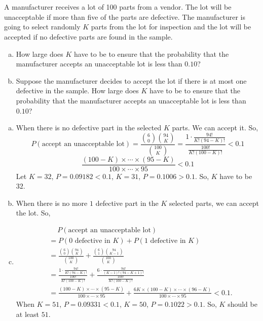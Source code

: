 \documentclass[14pt]{elegantbook}
\begin{document}

\setcounter{chapter}{4}
\chapter{}
    \setcounter{chapter}{3}
    \setcounter{exer}{1}
    \begin{exercise}
        A manufacturer receives a lot of 100 parts from a vendor. The lot will be unacceptable if more than five of the parts are defective. The manufacturer is going to select randomly $K$ parts from the lot for inspection and the lot will be accepted if no defective parts are found in the sample. 
        \begin{enumerate}[(a)]
            \item How large does $K$ have to be to ensure that the probability that the manufacturer accepts an unacceptable lot is less than $0.10$? 
            \item Suppose the manufacturer decides to accept the lot if there is at most one defective in the sample. How large does $K$ have to be to ensure that the probability that the manufacturer accepts an unacceptable lot is less than $0.10$? 
        \end{enumerate}
    \end{exercise}

    \begin{solution}
        \begin{enumerate}[(a)]
            \item When there is no defective part in the selected $K$ parts. We can accept it. So, 
            \[P(\text{accept an unacceptable lot})=\frac{\binom{6}{0}\binom{94}{K}}{\binom{100}{K}}=\frac{1\cdot\frac{94!}{K!(94-K)!}}{\frac{100!}{K!(100-K)!}}<0.1\]
            \[\frac{(100-K)\times\cdots\times(95-K)}{100\times\cdots\times 95}<0.1\]
            Let $K=32$, $P=0.09182<0.1$, $K=31$, $P=0.1006>0.1$. So, $K$ have to be $32$. 
            \item When there is no more $1$ defective part in the $K$ selected parts, we can accept the lot. So,
            \item \begin{align*}
                &\quad\ P(\text{accept an unacceptable lot})\\&=P(\text{$0$ defective in $K$})+P(\text{$1$ defective in $K$})\\
                &=\frac{\binom{6}{0}\binom{94}{K}}{\binom{100}{K}}+\frac{\binom{6}{1}\binom{94}{K-1}}{\binom{100}{K}}\\
                &=\frac{1\cdot\frac{94!}{K!(94-K)!}}{\frac{100!}{K!(100-K)!}}+\frac{6\cdot\frac{94!}{(K-1)!(94-K+1)!}}{\frac{100!}{K!(100-K)!}}\\
                &=\frac{(100-K)\times\cdots\times(95-K)}{100\times\cdots\times 95}+\frac{6K\times(100-K)\times\cdots\times(96-K)}{100\times\cdots\times 95}<0.1. 
            \end{align*}
            When $K=51$, $P=0.09331<0.1$, $K=50$, $P=0.1022>0.1$. So, $K$ should be at least $51$. 
        \end{enumerate}
    \end{solution}
\end{document}
